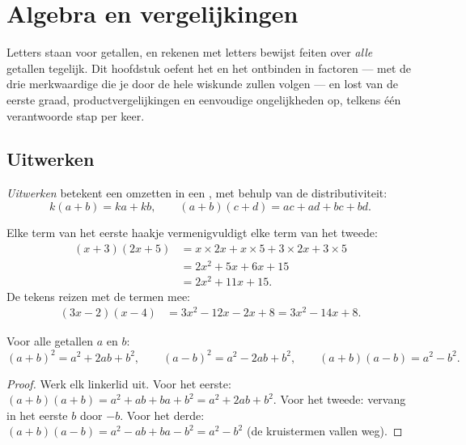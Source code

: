 \chapter{Algebra en vergelijkingen}\label{ch:g9:algebra}

Letters staan voor getallen, en rekenen met letters bewijst feiten over
\emph{alle} getallen tegelijk. Dit hoofdstuk oefent het  en het ontbinden
in factoren --- met de drie merkwaardige  die je door de hele wiskunde
zullen volgen --- en lost  van de eerste graad,
productvergelijkingen en eenvoudige ongelijkheden op, telkens één verantwoorde
stap per keer.

\section{Uitwerken}

\begin{definition}[Uitwerken]\label{def:g9:algebra:expand}
\emph{Uitwerken} betekent een  omzetten in een , met
behulp van de distributiviteit:
\[
k(a + b) = ka + kb,
\qquad
(a + b)(c + d) = ac + ad + bc + bd .
\]
\end{definition}

\begin{example}\label{ex:g9:algebra:expand}
Elke term van het eerste haakje vermenigvuldigt elke term van het tweede:
\begin{align*}
(x + 3)(2x + 5)
&= x \times 2x + x \times 5 + 3 \times 2x + 3 \times 5 \\
&= 2x^2 + 5x + 6x + 15 \\
&= 2x^2 + 11x + 15 .
\end{align*}
De tekens reizen met de termen mee:
\begin{align*}
(3x - 2)(x - 4)
&= 3x^2 - 12x - 2x + 8
= 3x^2 - 14x + 8 .
\end{align*}
\end{example}

\begin{theorem}\label{thm:g9:algebra:identities}
Voor alle getallen $a$ en $b$:
\[
(a+b)^2 = a^2 + 2ab + b^2,
\qquad
(a-b)^2 = a^2 - 2ab + b^2,
\qquad
(a+b)(a-b) = a^2 - b^2 .
\]
\end{theorem}

\begin{proof}
Werk elk linkerlid uit. Voor het eerste:
$(a+b)(a+b) = a^2 + ab + ba + b^2 = a^2 + 2ab + b^2$. Voor het tweede: vervang in
het eerste $b$ door $-b$. Voor het derde:
$(a+b)(a-b) = a^2 - ab + ba - b^2 = a^2 - b^2$ (de kruistermen vallen weg).
\end{proof}

